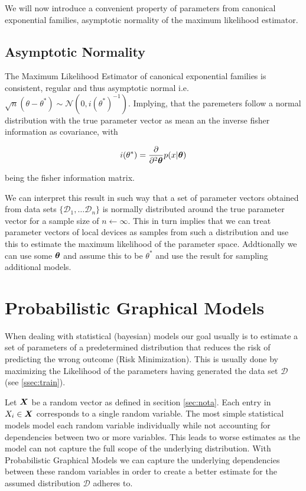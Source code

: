 We will now introduce a convenient property of parameters from canonical exponential families, asymptotic normality of the maximum likelihood estimator. 

\subsection{Asymptotic Normality}
\label{ssec:asymp}
The Maximum Likelihood Estimator of canonical exponential families is consistent, regular and thus asymptotic normal i.e. $\sqrt{n}(\theta - \theta^*) \sim \mathcal{N}(0, i(\theta^*)^{-1})$.
Implying, that the paremeters follow a normal distribution with the  true parameter vector as mean an the inverse fisher information as covariance, with 

\begin{equation}
    i(\theta^*) = \frac{\partial}{\partial^2 \boldsymbol{\theta}} p(x \lvert \boldsymbol{\theta})
\end{equation}

being the fisher information matrix.

We can interpret this result in such way that a set of parameter vectors obtained from data sets $\{\mathcal{D}_1, \ldots \mathcal{D}_n\}$ is normally distributed around the true parameter vector for a sample size of $n \leftarrow \infty$. 
This in turn implies that we can treat parameter vectors of local devices as samples from such a distribution and use this to estimate the maximum likelihood of the parameter space.
Addtionally we can use some $\boldsymbol{\theta}$ and assume this to be $\theta^*$ and use the result for sampling additional models.


\section{Probabilistic Graphical Models}
\label{sec:pgm}
When dealing with statistical (bayesian) models our goal usually is to estimate a set of parameters of a predetermined distribution that reduces the risk of predicting the wrong outcome (Risk Minimization). 
This is usually done by maximizing the Likelihood of the parameters having generated the data set $\mathcal{D}$ (see \ref{ssec:train}).

Let $\boldsymbol{X}$ be a random vector as defined in secition \ref{sec:nota}. 
Each entry in $X_i \in \boldsymbol{X}$ corresponds to a single random variable.
The most simple statistical models model each random variable individually while not accounting for dependencies between two or more variables.
This leads to worse estimates as the model can not capture the full scope of the underlying distribution.
With Probabilistic Graphical Models we can capture the underlying dependencies between these random variables in order to create a better estimate for the assumed distribution $\mathcal{D}$ adheres to.

